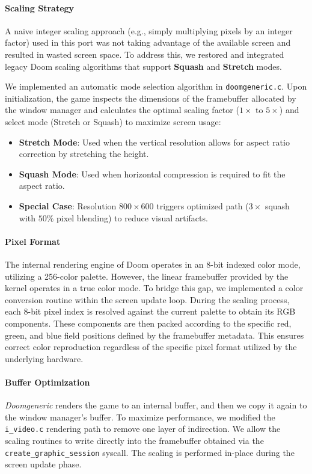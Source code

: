 \documentclass[a4paper,10pt,twoside]{report}
\theoremstyle{definition}
\begin{document}
\paragraph{Scaling Strategy}
A naive integer scaling approach (e.g., simply multiplying pixels by an integer factor) used in this port was not taking advantage of the available screen and resulted in wasted screen space. To address this, we restored and integrated legacy Doom scaling algorithms that support \textbf{Squash} and \textbf{Stretch} modes.

We implemented an automatic mode selection algorithm in \texttt{doomgeneric.c}. Upon initialization, the game inspects the dimensions of the framebuffer allocated by the window manager and calculates the optimal scaling factor ($1\times$ to $5\times$) and select mode (Stretch or Squash) to maximize screen usage:
\begin{itemize}
    \item \textbf{Stretch Mode}: Used when the vertical resolution allows for aspect ratio correction by stretching the height.
    \item \textbf{Squash Mode}: Used when horizontal compression is required to fit the aspect ratio.
    \item \textbf{Special Case}: Resolution $800 \times 600$ triggers optimized path ($3\times$ squash with $50\%$ pixel blending) to reduce visual artifacts.
\end{itemize}

\paragraph{Pixel Format}
The internal rendering engine of Doom operates in an 8-bit indexed color mode, utilizing a 256-color palette. However, the linear framebuffer provided by the kernel operates in a true color mode. To bridge this gap, we implemented a color conversion routine within the screen update loop. During the scaling process, each 8-bit pixel index is resolved against the current palette to obtain its RGB components. These components are then packed according to the specific red, green, and blue field positions defined by the framebuffer metadata. This ensures correct color reproduction regardless of the specific pixel format utilized by the underlying hardware.

\paragraph{Buffer Optimization}
\textit{Doomgeneric} renders the game to an internal buffer, and then we copy it again to the window manager's buffer. To maximize performance, we modified the \texttt{i\_video.c} rendering path to remove one layer of indirection. We allow the scaling routines to write directly into the framebuffer obtained via the \texttt{create\_graphic\_session} syscall. The scaling is performed in-place during the screen update phase.
\end{document}
